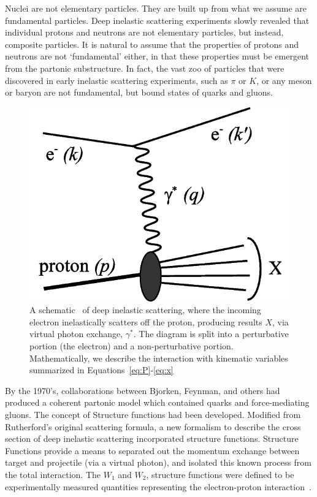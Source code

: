 Nuclei are not elementary particles. They are built up from what we assume are
fundamental particles. Deep inelastic scattering experiments slowly revealed
that individual protons and neutrons are not elementary particles, but instead,
composite particles.  It is natural to assume that the properties of protons and
neutrons are not `fundamental' either, in that these properties must be emergent
from the partonic substructure. In fact, the vast zoo of particles that were
discovered in early inelastic scattering experiments, such as $\pi$ or $K$, or
any meson or baryon are not fundamental, but bound states of quarks and gluons.

\begin{figure}[ht]
	\centering
	\includegraphics[width=0.6\linewidth]{./figures/deep_inelastic_basic.png}
	\caption{
    A schematic~\cite{Ddn2_2008} of deep inelastic scattering, where the
    incoming electron inelastically scatters off the proton, producing results
    $X$, via virtual photon exchange, $\gamma^*$. The diagram is split into a
    perturbative portion (the electron) and a non-perturbative portion.
    Mathematically, we describe the interaction with kinematic variables
    summarized in Equations~\ref{eq:P}-\ref{eq:x}
  }
	\label{fig:disschematic}
\end{figure}

By the 1970's, collaborations between Bjorken, Feynman, and others had produced
a coherent partonic model which contained quarks and force-mediating gluons.
The concept of Structure functions had been developed. Modified from
Rutherford's original scattering formula, a new formalism to describe the cross
section of deep inelastic scattering incorporated structure functions. Structure
Functions provide a means to separated out the momentum exchange between target
and projectile (via a virtual photon), and isolated this known process from the
total interaction. The $W_1$ and $W_2$, structure functions were defined to be
experimentally measured quantities representing the electron-proton
interaction~\cite{Riordan1992}.


